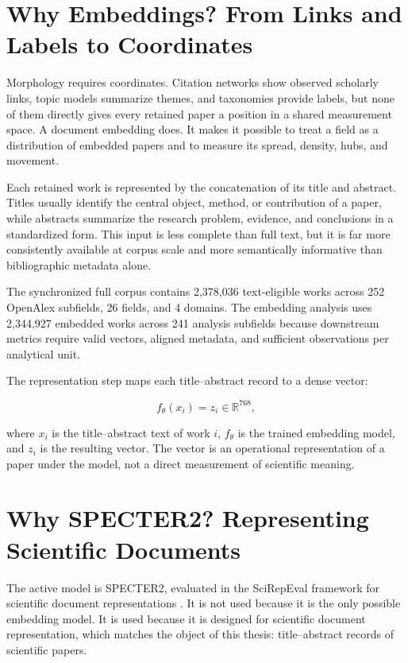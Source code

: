 
\section{Why Embeddings? From Links and Labels to Coordinates}

Morphology requires coordinates. Citation networks show observed scholarly links, topic models summarize themes, and taxonomies provide labels, but none of them directly gives every retained paper a position in a shared measurement space. A document embedding does. It makes it possible to treat a field as a distribution of embedded papers and to measure its spread, density, hubs, and movement.

Each retained work is represented by the concatenation of its title and abstract. Titles usually identify the central object, method, or contribution of a paper, while abstracts summarize the research problem, evidence, and conclusions in a standardized form. This input is less complete than full text, but it is far more consistently available at corpus scale and more semantically informative than bibliographic metadata alone.

The synchronized full corpus contains 2,378,036 text-eligible works across 252 OpenAlex subfields, 26 fields, and 4 domains. The embedding analysis uses 2,344,927 embedded works across 241 analysis subfields because downstream metrics require valid vectors, aligned metadata, and sufficient observations per analytical unit.



The representation step maps each title--abstract record to a dense vector:

\[
f_{\theta}(x_i) = z_i \in \mathbb{R}^{768},
\]

where \(x_i\) is the title--abstract text of work \(i\), \(f_{\theta}\) is the trained embedding model, and \(z_i\) is the resulting vector. The vector is an operational representation of a paper under the model, not a direct measurement of scientific meaning.

\section{Why SPECTER2? Representing Scientific Documents}

The active model is SPECTER2, evaluated in the SciRepEval framework for scientific document representations \parencite{singh2023scirepeval}. It is not used because it is the only possible embedding model. It is used because it is designed for scientific document representation, which matches the object of this thesis: title--abstract records of scientific papers.

